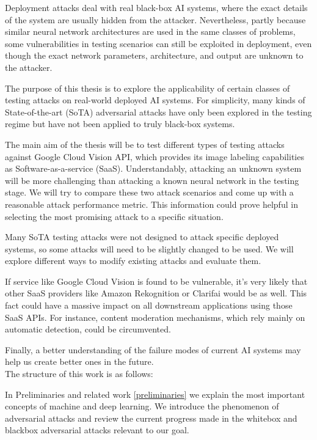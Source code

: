Deployment attacks deal with real black-box AI systems, where the exact details of the system are usually hidden from the attacker. Nevertheless, partly because similar neural network architectures are used in the same classes of problems, some vulnerabilities in testing scenarios can still be exploited in deployment, even though the exact network parameters, architecture, and output are unknown to the attacker.

The purpose of this thesis is to explore the applicability of certain classes of testing attacks on real-world deployed AI systems. For simplicity, many kinds of State-of-the-art (SoTA) adversarial attacks have only been explored in the testing regime but have not been applied to truly black-box systems. 

The main aim of the thesis will be to test different types of testing attacks against Google Cloud Vision API, which provides its image labeling capabilities as Software-as-a-service (SaaS). Understandably, attacking an unknown system will be more challenging than attacking a known neural network in the testing stage. We will try to compare these two attack scenarios and come up with a reasonable attack performance metric. This information could prove helpful in selecting the most promising attack to a specific situation. 

Many SoTA testing attacks were not designed to attack specific deployed systems, so some attacks will need to be slightly changed to be used. We will explore different ways to modify existing attacks and evaluate them.

If service like Google Cloud Vision is found to be vulnerable, it's very likely that other SaaS providers like Amazon Rekognition or Clarifai would be as well. This fact could have a massive impact on all downstream applications using those SaaS APIs. For instance, content moderation mechanisms, which rely mainly on automatic detection, could be circumvented.

Finally, a better understanding of the failure modes of current AI systems may help us create better ones in the future. \\


The structure of this work is as follows:

In Preliminaries and related work \ref{preliminaries} we explain the most important concepts of machine and deep learning. We introduce the phenomenon of adversarial attacks and review the current progress made in the whitebox and blackbox adversarial attacks relevant to our goal.

